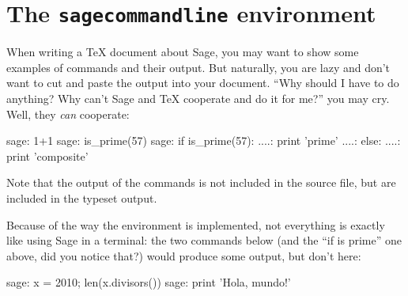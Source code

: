 \documentclass{article}
\begin{document}
\begin{comment}
\begin{sageblock}
  x = lambda t: t
  y(t) = t*sin(1/t)
  gnuplot(x, y, [0.01, 0.02..(0.5)] + [0.55, 0.6..2], 'example-tikz2.table')
\end{sageblock}

\begin{center}
\begin{tikzpicture}[scale=3]
 \draw[very thin,->] (-0.25,0) -- (2,0);
 \draw[very thin,->] (0,-1/3) -- (0,1);
 \draw[smooth, red] plot file {example-tikz2.table};
\end{tikzpicture}
\end{center}

This style of plotting will become even more useful and powerful when
the new TikZ Data Visualization library is available---you will be able
to feed TikZ a bunch of data points, and it automatically make a very
nice plot for you, including axes, labels, and so on.

\end{comment}

\section{The \texttt{sagecommandline} environment}

When writing a \TeX{} document about Sage, you may want to show some
examples of commands and their output. But naturally, you are lazy and
don't want to cut and paste the output into your document. ``Why should
I have to do anything? Why can't Sage and \TeX{} cooperate and do it for
me?'' you may cry. Well, they \emph{can} cooperate:

\begin{sagecommandline}
  sage: 1+1
  sage: is_prime(57)
  sage: if is_prime(57):
  ....:     print 'prime'
  ....: else:
  ....:     print 'composite'
\end{sagecommandline}

Note that the output of the commands is not included in the source file,
but are included in the typeset output.

Because of the way the environment is implemented, not everything is
exactly like using Sage in a terminal: the two commands below (and the
``if is prime'' one above, did you notice that?) would produce some
output, but don't here:

\begin{sagecommandline}
  sage: x = 2010; len(x.divisors())
  sage: print 'Hola, mundo!'
\end{sagecommandline}
\end{document}

